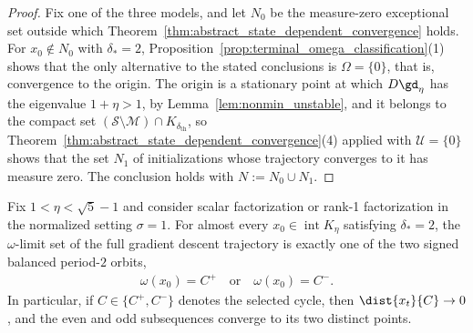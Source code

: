\documentclass{article}
\begin{document}
\begin{proof}
Fix one of the three models, and let $N_0$ be the measure-zero exceptional set
outside which Theorem~\ref{thm:abstract_state_dependent_convergence} holds.
For $x_0\notin N_0$ with $\delta_\ast=2$,
Proposition~\ref{prop:terminal_omega_classification}(1) shows that the only
alternative to the stated conclusions is $\Omega=\{0\}$, that is, convergence
to the origin.
The origin is a stationary point at which $D\gd_\eta$ has the eigenvalue
$1+\eta>1$, by Lemma~\ref{lem:nonmin_unstable}, and it belongs to the compact
set $(\mathcal S\setminus\mathcal M)\cap K_{\delta_{\mathrm{th}}}$, so
Theorem~\ref{thm:abstract_state_dependent_convergence}(4) applied with
$\mathcal U=\{0\}$ shows that the set $N_1$ of initializations whose trajectory
converges to it has measure zero. The conclusion holds with
$N:=N_0\cup N_1$.
\end{proof}

\begin{theorem}
\label{thm:terminal_period_two_inheritance}
Fix $1<\eta<\sqrt5-1$ and consider scalar factorization or rank-1
factorization in the normalized setting $\sigma=1$. For almost every
$x_0\in\operatorname{int}K_\eta$ satisfying $\delta_\ast=2$, the $\omega$-limit
set of the full gradient descent trajectory is exactly one of the two signed
balanced period-$2$ orbits,
\begin{align}
    \omega(x_0)=C^+
    \quad\text{or}\quad
    \omega(x_0)=C^- .
\end{align}
In particular, if $C\in\{C^+,C^-\}$ denotes the selected cycle, then
$\dist{x_t}{C}\to0$, and the even and odd subsequences converge to its two
distinct points.
\end{theorem}
\end{document}
